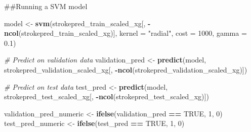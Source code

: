 \documentclass[
]{article}
\newenvironment{Shaded}{\begin{snugshade}}{\end{snugshade}}
\newcommand{\AttributeTok}[1]{\textcolor[rgb]{0.13,0.29,0.53}{#1}}
\newcommand{\CommentTok}[1]{\textcolor[rgb]{0.56,0.35,0.01}{\textit{#1}}}
\newcommand{\ConstantTok}[1]{\textcolor[rgb]{0.56,0.35,0.01}{#1}}
\newcommand{\DecValTok}[1]{\textcolor[rgb]{0.00,0.00,0.81}{#1}}
\newcommand{\FloatTok}[1]{\textcolor[rgb]{0.00,0.00,0.81}{#1}}
\newcommand{\FunctionTok}[1]{\textcolor[rgb]{0.13,0.29,0.53}{\textbf{#1}}}
\newcommand{\NormalTok}[1]{#1}
\newcommand{\OtherTok}[1]{\textcolor[rgb]{0.56,0.35,0.01}{#1}}
\newcommand{\SpecialCharTok}[1]{\textcolor[rgb]{0.81,0.36,0.00}{\textbf{#1}}}
\newcommand{\StringTok}[1]{\textcolor[rgb]{0.31,0.60,0.02}{#1}}
\begin{document}
\#\#Running a SVM model

\begin{Shaded}
\begin{Highlighting}[]
\NormalTok{model }\OtherTok{\textless{}{-}} \FunctionTok{svm}\NormalTok{(strokepred\_train\_scaled\_xg[, }\SpecialCharTok{{-}}\FunctionTok{ncol}\NormalTok{(strokepred\_train\_scaled\_xg)], }
             \AttributeTok{kernel =} \StringTok{"radial"}\NormalTok{, }\AttributeTok{cost =} \DecValTok{1000}\NormalTok{, }\AttributeTok{gamma =} \FloatTok{0.1}\NormalTok{)  }
\end{Highlighting}
\end{Shaded}

\begin{Shaded}
\begin{Highlighting}[]
\CommentTok{\# Predict on validation data}
\NormalTok{validation\_pred }\OtherTok{\textless{}{-}} \FunctionTok{predict}\NormalTok{(model, strokepred\_validation\_scaled\_xg[, }\SpecialCharTok{{-}}\FunctionTok{ncol}\NormalTok{(strokepred\_validation\_scaled\_xg)])}



\CommentTok{\# Predict on test data}
\NormalTok{test\_pred }\OtherTok{\textless{}{-}} \FunctionTok{predict}\NormalTok{(model, strokepred\_test\_scaled\_xg[, }\SpecialCharTok{{-}}\FunctionTok{ncol}\NormalTok{(strokepred\_test\_scaled\_xg)])}
\end{Highlighting}
\end{Shaded}

\begin{Shaded}
\begin{Highlighting}[]
\NormalTok{validation\_pred\_numeric }\OtherTok{\textless{}{-}} \FunctionTok{ifelse}\NormalTok{(validation\_pred }\SpecialCharTok{==} \ConstantTok{TRUE}\NormalTok{, }\DecValTok{1}\NormalTok{, }\DecValTok{0}\NormalTok{)}
\NormalTok{test\_pred\_numeric }\OtherTok{\textless{}{-}} \FunctionTok{ifelse}\NormalTok{(test\_pred }\SpecialCharTok{==} \ConstantTok{TRUE}\NormalTok{, }\DecValTok{1}\NormalTok{, }\DecValTok{0}\NormalTok{)}
\end{Highlighting}
\end{Shaded}

\begin{Shaded}
\end{Shaded}
\end{document}
